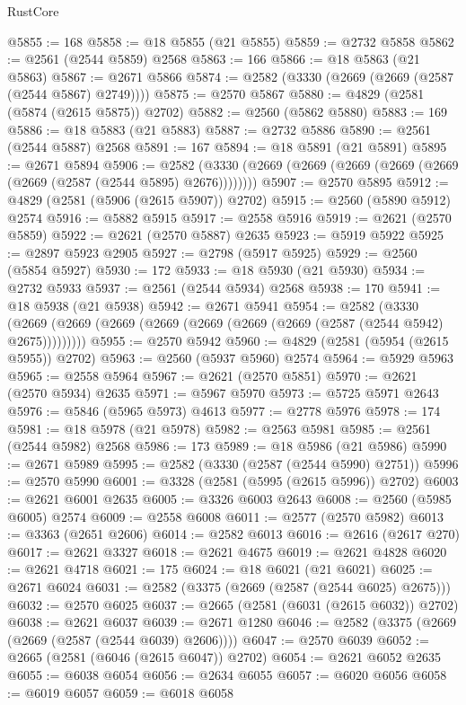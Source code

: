 \begin{lexlean}{RustCore}
\begin{coremodule}
@5855 := 168
@5858 := @18 @5855 (@21 @5855)
@5859 := @2732 @5858
@5862 := @2561 (@2544 @5859) @2568
@5863 := 166
@5866 := @18 @5863 (@21 @5863)
@5867 := @2671 @5866
@5874 := @2582 (@3330 (@2669 (@2669 (@2587 (@2544 @5867) @2749))))
@5875 := @2570 @5867
@5880 := @4829 (@2581 (@5874 (@2615 @5875)) @2702)
@5882 := @2560 (@5862 @5880)
@5883 := 169
@5886 := @18 @5883 (@21 @5883)
@5887 := @2732 @5886
@5890 := @2561 (@2544 @5887) @2568
@5891 := 167
@5894 := @18 @5891 (@21 @5891)
@5895 := @2671 @5894
@5906 := @2582 (@3330 (@2669 (@2669 (@2669 (@2669 (@2669 (@2669 (@2587 (@2544 @5895) @2676))))))))
@5907 := @2570 @5895
@5912 := @4829 (@2581 (@5906 (@2615 @5907)) @2702)
@5915 := @2560 (@5890 @5912) @2574
@5916 := @5882 @5915
@5917 := @2558 @5916
@5919 := @2621 (@2570 @5859)
@5922 := @2621 (@2570 @5887) @2635
@5923 := @5919 @5922
@5925 := @2897 @5923 @2905
@5927 := @2798 (@5917 @5925)
@5929 := @2560 (@5854 @5927)
@5930 := 172
@5933 := @18 @5930 (@21 @5930)
@5934 := @2732 @5933
@5937 := @2561 (@2544 @5934) @2568
@5938 := 170
@5941 := @18 @5938 (@21 @5938)
@5942 := @2671 @5941
@5954 := @2582
    (@3330 (@2669 (@2669 (@2669 (@2669 (@2669 (@2669 (@2669 (@2587 (@2544 @5942) @2675)))))))))
@5955 := @2570 @5942
@5960 := @4829 (@2581 (@5954 (@2615 @5955)) @2702)
@5963 := @2560 (@5937 @5960) @2574
@5964 := @5929 @5963
@5965 := @2558 @5964
@5967 := @2621 (@2570 @5851)
@5970 := @2621 (@2570 @5934) @2635
@5971 := @5967 @5970
@5973 := @5725 @5971 @2643
@5976 := @5846 (@5965 @5973) @4613
@5977 := @2778 @5976
@5978 := 174
@5981 := @18 @5978 (@21 @5978)
@5982 := @2563 @5981
@5985 := @2561 (@2544 @5982) @2568
@5986 := 173
@5989 := @18 @5986 (@21 @5986)
@5990 := @2671 @5989
@5995 := @2582 (@3330 (@2587 (@2544 @5990) @2751))
@5996 := @2570 @5990
@6001 := @3328 (@2581 (@5995 (@2615 @5996)) @2702)
@6003 := @2621 @6001 @2635
@6005 := @3326 @6003 @2643
@6008 := @2560 (@5985 @6005) @2574
@6009 := @2558 @6008
@6011 := @2577 (@2570 @5982)
@6013 := @3363 (@2651 @2606)
@6014 := @2582 @6013
@6016 := @2616 (@2617 @270)
@6017 := @2621 @3327
@6018 := @2621 @4675
@6019 := @2621 @4828
@6020 := @2621 @4718
@6021 := 175
@6024 := @18 @6021 (@21 @6021)
@6025 := @2671 @6024
@6031 := @2582 (@3375 (@2669 (@2587 (@2544 @6025) @2675)))
@6032 := @2570 @6025
@6037 := @2665 (@2581 (@6031 (@2615 @6032)) @2702)
@6038 := @2621 @6037
@6039 := @2671 @1280
@6046 := @2582 (@3375 (@2669 (@2669 (@2587 (@2544 @6039) @2606))))
@6047 := @2570 @6039
@6052 := @2665 (@2581 (@6046 (@2615 @6047)) @2702)
@6054 := @2621 @6052 @2635
@6055 := @6038 @6054
@6056 := @2634 @6055
@6057 := @6020 @6056
@6058 := @6019 @6057
@6059 := @6018 @6058

\end{coremodule}
\end{lexlean}
